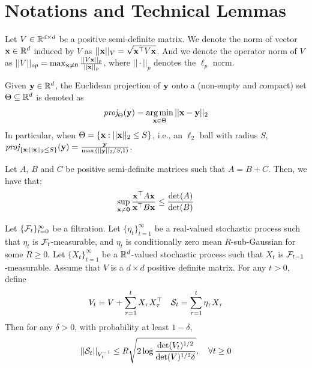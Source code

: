 \appendix
\section{Notations and Technical Lemmas}\label{lem:technical_lem}
Let $V \in \mathbb{R}^{d \times d}$ be a positive semi-definite matrix. We denote the norm of vector $\mathbf{x} \in \mathbb{R}^{d}$ induced by $V$ as $||\mathbf{x}||_{V}=\sqrt{\mathbf{x}^{\top} V \mathbf{x}}$. And we denote the operator norm of $V$ as $||V||_{op}=\max_{\mathbf{x} \neq 0} \frac{||V \mathbf{x}||_{p}}{||\mathbf{x}||_{p}}$, where $||\cdot||_{p}$ denotes the $\ell_p$ norm.

Given $\mathbf{y} \in \mathbb{R}^{d}$, the Euclidean projection of $\mathbf{y}$ onto a (non-empty and compact) set $\Theta \subseteq \mathbb{R}^{d}$ is denoted as
\begin{align*}
    \textit{proj}_{\Theta}(\mathbf{y})=\operatorname*{arg\,min}_{\mathbf{x} \in \Theta} ||\mathbf{x}-\mathbf{y}||_{2}
\end{align*}
In particular, when $\Theta=\{\mathbf{x}:||\mathbf{x}||_{2} \leq S\}$, i.e., an $\ell_2$ ball with radius $S$, $\textit{proj}_{\{\mathbf{x}:||\mathbf{x}||_{2} \leq S\}}(\mathbf{y})=\frac{\mathbf{y}}{\max{(||\mathbf{y}||_{2}/S,1)}}$.


\begin{lemma} \label{lem:quadratic_det_inequality}
Let $A$, $B$ and $C$ be positive semi-definite matrices such that $A=B+C$. Then, we have that:
\begin{align*}
    \sup_{\mathbf{x} \neq \textbf{0}} \frac{\mathbf{x}^{\top} A \mathbf{x}}{\mathbf{x}^{\top} B \mathbf{x}} \leq \frac{\det(A)}{\det(B)}
\end{align*}
\end{lemma}

\begin{lemma} \label{lem:self_normalized_bound}
Let $\{\mathcal{F}_{t}\}_{t=0}^{\infty}$ be a filtration. Let $\{\eta_{t}\}_{t=1}^{\infty}$ be a real-valued stochastic process such that $\eta_{t}$ is $\mathcal{F}_{t}$-measurable, and $\eta_{t}$ is conditionally zero mean $R$-sub-Gaussian for some $R \geq 0$.
Let $\{X_{t}\}_{t=1}^{\infty}$ be a $\mathbb{R}^{d}$-valued stochastic process such that $X_{t}$ is $\mathcal{F}_{t-1}$-measurable. Assume that $V$ is a $d \times d$ positive definite matrix. For any $t > 0$, define
\begin{align*}
    V_{t}=V+\sum_{\tau=1}^{t} X_{\tau} X_{\tau}^{\top} \quad \mathcal{S}_{t}=\sum_{\tau=1}^{t}\eta_{\tau} X_{\tau} 
\end{align*}
Then for any $\delta >0$, with probability at least $1-\delta$,
\begin{align*}
    ||\mathcal{S}_{t}||_{V_{t}^{-1}} \leq  R \sqrt{2\log{\frac{\det(V_{t})^{1/2}}{\det(V)^{1/2}\delta}}}, \quad \forall t\geq 0
\end{align*}
\end{lemma}

